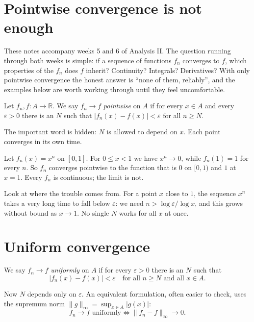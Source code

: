 \section{Pointwise convergence is not enough}

These notes accompany weeks 5 and 6 of Analysis II. The question running through both weeks is simple: if a sequence of functions $f_n$ converges to $f$, which properties of the $f_n$ does $f$ inherit? Continuity? Integrals? Derivatives? With only pointwise convergence the honest answer is ``none of them, reliably'', and the examples below are worth working through until they feel uncomfortable.

\begin{definition}
Let $f_n, f \colon A \to \mathbb{R}$. We say $f_n \to f$ \emph{pointwise} on $A$ if for every $x \in A$ and every $\varepsilon > 0$ there is an $N$ such that $|f_n(x) - f(x)| < \varepsilon$ for all $n \ge N$.
\end{definition}

The important word is hidden: $N$ is allowed to depend on $x$. Each point converges in its own time.

\begin{example}
Let $f_n(x) = x^n$ on $[0,1]$. For $0 \le x < 1$ we have $x^n \to 0$, while $f_n(1) = 1$ for every $n$. So $f_n$ converges pointwise to the function that is $0$ on $[0,1)$ and $1$ at $x = 1$. Every $f_n$ is continuous; the limit is not.
\end{example}

Look at where the trouble comes from. For a point $x$ close to $1$, the sequence $x^n$ takes a very long time to fall below $\varepsilon$: we need $n > \log \varepsilon / \log x$, and this grows without bound as $x \to 1$. No single $N$ works for all $x$ at once.

\section{Uniform convergence}

\begin{definition}
We say $f_n \to f$ \emph{uniformly} on $A$ if for every $\varepsilon > 0$ there is an $N$ such that
\[
  |f_n(x) - f(x)| < \varepsilon \quad \text{for all } n \ge N \text{ and all } x \in A.
\]
\end{definition}

Now $N$ depends only on $\varepsilon$. An equivalent formulation, often easier to check, uses the supremum norm $\|g\|_\infty = \sup_{x \in A} |g(x)|$:
\begin{equation}
  f_n \to f \text{ uniformly} \iff \|f_n - f\|_\infty \to 0. \label{eq:supnorm}
\end{equation}

